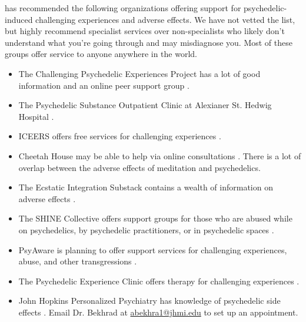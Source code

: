 \documentclass[12pt,letterpaper]{book}
\begin{document}
\textcite{supportNetwork} has recommended the following organizations offering support for psychedelic-induced challenging experiences and adverse effects. We have not vetted the list, but highly recommend specialist services over non-specialists who likely don't understand what you're going through and may misdiagnose you. Most of these groups offer service to anyone anywhere in the world.
\begin{itemize}
	\item The Challenging Psychedelic Experiences Project has a lot of good information and an online peer support group \cite{peersupportgroup}.
	\item The Psychedelic Substance Outpatient Clinic at Alexianer St. Hedwig Hospital \cite{alexianerClinic}.
	\item ICEERS offers free services for challenging experiences \cite{iceers}.
	\item Cheetah House may be able to help via online consultations \cite{cheetahHouse}. There is a lot of overlap between the adverse effects of meditation and psychedelics.
	\item The Ecstatic Integration Substack contains a wealth of information on adverse effects \cite{ecstaticIntegration}.
	\item The SHINE Collective offers support groups for those who are abused while on psychedelics, by psychedelic practitioners, or in psychedelic spaces \cite{shineCollective}.
	\item PsyAware is planning to offer support services for challenging experiences, abuse, and other transgressions \cite{psyaware}.
	\item The Psychedelic Experience Clinic offers therapy for challenging experiences \cite{rabbitClinic}.
	\item John Hopkins Personalized Psychiatry has knowledge of psychedelic side effects \cite{hopkinsPersonalized}. Email Dr. Bekhrad at \href{mailto:abekhra1@jhmi.edu}{abekhra1@jhmi.edu} to set up an appointment.
\end{itemize}
\end{document}
